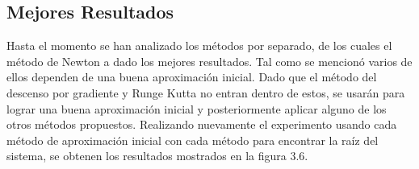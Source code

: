\subsection{Mejores Resultados}

\par Hasta el momento se han analizado los m\'etodos por separado, de los cuales el m\'etodo de Newton a dado los mejores resultados. Tal como se mencion\'o varios de ellos dependen de una buena aproximaci\'on inicial. Dado que el m\'etodo del descenso por gradiente y Runge Kutta no entran dentro de estos, se usar\'an para lograr una buena aproximaci\'on inicial y posteriormente aplicar alguno de los otros m\'etodos propuestos. Realizando nuevamente el experimento usando cada m\'etodo de aproximaci\'on inicial con cada m\'etodo para encontrar la ra\'iz del sistema, se obtenen los resultados mostrados en la figura 3.6.\\

